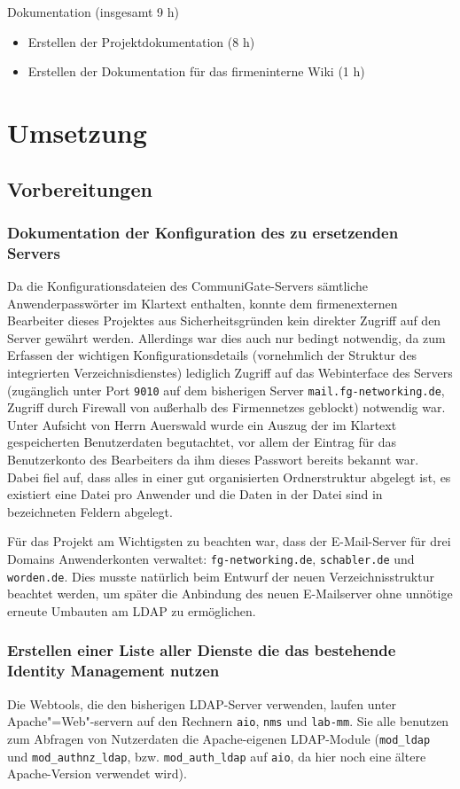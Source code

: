\documentclass[11pt,a4paper,titlepage=firstiscover,headsepline,bibtotoc]{scrartcl} %
\begin{document}
Dokumentation (insgesamt 9 h)
	\begin{itemize}
	\item Erstellen der Projektdokumentation (8 h)
	\item Erstellen der Dokumentation für das firmeninterne Wiki (1 h)
	\end{itemize}

\section{Umsetzung}
\subsection{Vorbereitungen}
\subsubsection{Dokumentation der Konfiguration des zu ersetzenden Servers}\label{sec:Konfig-Doku-Alt}
Da die Konfigurationsdateien des CommuniGate-Servers sämtliche Anwenderpasswörter im Klartext enthalten, konnte dem firmenexternen Bearbeiter dieses Projektes aus Sicherheitsgründen kein direkter Zugriff auf den Server gewährt werden. Allerdings war dies auch nur bedingt notwendig, da zum Erfassen der wichtigen Konfigurationsdetails (vornehmlich der Struktur des integrierten Verzeichnisdienstes) lediglich Zugriff auf das Webinterface des Servers (zugänglich unter Port \texttt{9010} auf dem bisherigen Server \texttt{mail.fg-networking.de}, Zugriff durch Firewall von außerhalb des Firmennetzes geblockt) notwendig war. Unter Aufsicht von Herrn Auerswald wurde ein Auszug der im Klartext gespeicherten Benutzerdaten begutachtet, vor allem der Eintrag für das Benutzerkonto des Bearbeiters da ihm dieses Passwort bereits bekannt war. Dabei fiel auf, dass alles in einer gut organisierten Ordnerstruktur abgelegt ist, es existiert eine Datei pro Anwender und die Daten in der Datei sind in bezeichneten Feldern abgelegt.

Für das Projekt am Wichtigsten zu beachten war, dass der E-Mail-Server für drei Domains Anwenderkonten verwaltet: \texttt{fg-networking.de}, \texttt{schabler.de} und \texttt{worden.de}. Dies musste natürlich beim Entwurf der neuen Verzeichnisstruktur beachtet werden, um später die Anbindung des neuen E-Mailserver ohne unnötige erneute Umbauten am LDAP zu ermöglichen.

\subsubsection{Erstellen einer Liste aller Dienste die das bestehende Identity Management nutzen}
Die Webtools, die den bisherigen LDAP-Server verwenden, laufen unter Apache"=Web"-servern auf den Rechnern \texttt{aio}, \texttt{nms} und \texttt{lab-mm}. Sie alle benutzen zum Abfragen von Nutzerdaten die Apache-eigenen LDAP-Module (\texttt{mod\_ldap} und \texttt{mod\_authnz\_ldap}, bzw. \texttt{mod\_auth\_ldap} auf \texttt{aio}, da hier noch eine ältere Apache-Version verwendet wird). 
\end{document}
